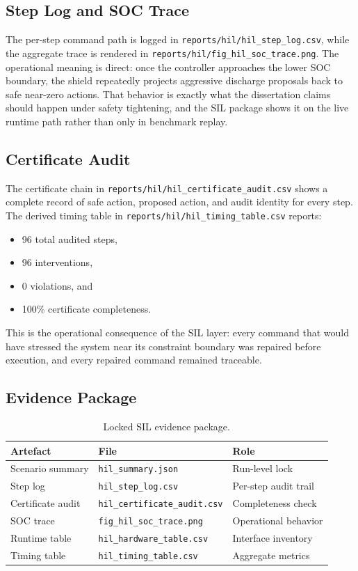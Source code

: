 \subsection{Step Log and SOC Trace}

The per-step command path is logged in
\texttt{reports/hil/hil\_step\_log.csv}, while the aggregate trace is rendered
in \texttt{reports/hil/fig\_hil\_soc\_trace.png}.  The operational meaning is
direct: once the controller approaches the lower SOC boundary, the shield
repeatedly projects aggressive discharge proposals back to safe near-zero
actions.  That behavior is exactly what the dissertation claims should
happen under safety tightening, and the SIL package shows it on the live
runtime path rather than only in benchmark replay.

\subsection{Certificate Audit}

The certificate chain in
\texttt{reports/hil/hil\_certificate\_audit.csv} shows a complete record of
safe action, proposed action, and audit identity for every step.  The
derived timing table in \texttt{reports/hil/hil\_timing\_table.csv} reports:

\begin{itemize}
  \item 96 total audited steps,
  \item 96 interventions,
  \item 0 violations, and
  \item 100\% certificate completeness.
\end{itemize}

This is the operational consequence of the SIL layer: every command
that would have stressed the system near its constraint boundary was repaired before
execution, and every repaired command remained traceable.

\subsection{Evidence Package}

\begin{table}[ht]
\centering
\caption{Locked SIL evidence package.}
\label{tab:hil-evidence}
\begin{tabular}{lll}
\toprule
\textbf{Artefact} & \textbf{File} & \textbf{Role} \\
\midrule
Scenario summary & \texttt{hil\_summary.json} & Run-level lock \\
Step log & \texttt{hil\_step\_log.csv} & Per-step audit trail \\
Certificate audit & \texttt{hil\_certificate\_audit.csv} & Completeness check \\
SOC trace & \texttt{fig\_hil\_soc\_trace.png} & Operational behavior \\
Runtime table & \texttt{hil\_hardware\_table.csv} & Interface inventory \\
Timing table & \texttt{hil\_timing\_table.csv} & Aggregate metrics \\
\bottomrule
\end{tabular}
\end{table}

